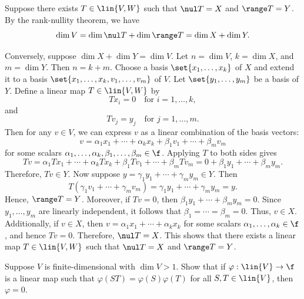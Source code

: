 \begin{sol}
    Suppose there exists $T \in \lin{V, W}$ such that $\nul T = X$ and $\range T = Y$. By the rank-nullity theorem, we have
    \[\dim V = \dim \nul T + \dim \range T = \dim X + \dim Y.\]

    Conversely, suppose $\dim X + \dim Y = \dim V$. Let $n = \dim V$, $k = \dim X$, and $m = \dim Y$. Then $n = k + m$. Choose a basis $\set{x_1, \ldots, x_k}$ of $X$ and extend it to a basis $\set{x_1, \ldots, x_k, v_1, \ldots, v_m}$ of $V$. Let $\set{y_1, \ldots, y_m}$ be a basis of $Y$. Define a linear map $T \in \lin{V, W}$ by
    \[Tx_i = 0 \quad \text{for } i = 1, \ldots, k,\]
    and
    \[Tv_j = y_j \quad \text{for } j = 1, \ldots, m.\]
    Then for any $v \in V$, we can express $v$ as a linear combination of the basis vectors:
    \[v = \alpha_1 x_1 + \cdots + \alpha_k x_k + \beta_1 v_1 + \cdots + \beta_m v_m\]
    for some scalars $\alpha_1, \ldots, \alpha_k, \beta_1, \ldots, \beta_m \in \f$. Applying $T$ to both sides gives
    \[Tv = \alpha_1 Tx_1 + \cdots + \alpha_k Tx_k + \beta_1 Tv_1 + \cdots + \beta_m Tv_m = 0 + \beta_1 y_1 + \cdots + \beta_m y_m.\]
    Therefore, $Tv \in Y$. Now suppose $y = \gamma_1 y_1 + \cdots + \gamma_m y_m \in Y$. Then
    \[T(\gamma_1 v_1 + \cdots + \gamma_m v_m) = \gamma_1 y_1 + \cdots + \gamma_m y_m = y.\]
    Hence, $\range T = Y$. Moreover, if $Tv = 0$, then $\beta_1 y_1 + \cdots + \beta_m y_m = 0$. Since $y_1, \ldots, y_m$ are linearly independent, it follows that $\beta_1 = \cdots = \beta_m = 0$. Thus, $v \in X$. Additionally, if $v \in X$, then $v = \alpha_1 x_1 + \cdots + \alpha_k x_k$ for some scalars $\alpha_1, \ldots, \alpha_k \in \f$, and hence $Tv = 0$. Therefore, $\nul T = X$. This shows that there exists a linear map $T \in \lin{V, W}$ such that $\nul T = X$ and $\range T = Y$.
\end{sol}

\begin{exercise}[3b32]
    Suppose $V$ is finite-dimensional with $\dim V > 1$. Show that if $\varphi: \lin{V} \to \f$ is a linear map such that $\varphi(ST) = \varphi(S)\varphi(T)$ for all $S, T \in \lin{V}$, then $\varphi = 0$.
    
\end{exercise}

